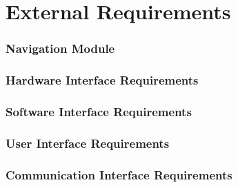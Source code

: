 \documentclass[11pt]{article}
\begin{document}
\section{External Requirements}

\subsubsection{Navigation Module}
  \subsubsection{Hardware Interface Requirements}
  
  \subsubsection{Software Interface Requirements}
  
  \subsubsection{User Interface Requirements}
  
  \subsubsection{Communication Interface Requirements}
\end{document}
